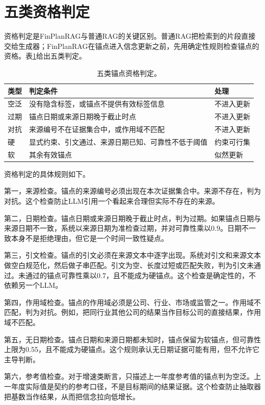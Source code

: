 \section{五类资格判定}

资格判定是FinPlanRAG与普通RAG的关键区别。普通RAG把检索到的片段直接交给生成器；FinPlanRAG在锚点进入信念更新之前，先用确定性规则检查锚点的资格。表\ref{tab:qualification}给出五类判定。

\begin{table}[H]
\centering
{}
\caption{五类锚点资格判定。}
\label{tab:qualification}
\begin{tabular}{p{2.1cm}p{7.0cm}p{4.2cm}}
\toprule
类型 & 判定条件 & 处理 \\
\midrule
空泛 & 没有隐含标签，或锚点不提供有效标签信息 & 不进入更新 \\
过期 & 锚点日期或来源日期晚于截止时点 & 不进入更新 \\
对抗 & 来源编号不在证据集合中，或作用域不匹配 & 不进入更新 \\
硬 & 显式约束、引文通过、来源日期已知、可靠性不低于阈值 & 约束可行集 \\
软 & 其余有效锚点 & 似然更新 \\
\bottomrule
\end{tabular}
\end{table}

资格判定的具体规则如下。

第一，来源检查。锚点的来源编号必须出现在本次证据集合中。来源不存在，判为对抗。这个检查防止LLM引用一个看起来合理但实际不存在的来源。

第二，日期检查。锚点日期或来源日期晚于截止时点，判为过期。如果锚点日期与来源日期不一致，系统以来源日期为准检查过期，并对可靠性乘以0.9。日期不一致本身不是拒绝理由，但它是一个时间一致性疑点。

第三，引文检查。锚点的引文必须在来源文本中逐字出现。系统对引文和来源文本做空白规范化，然后做子串匹配。引文为空、长度过短或匹配失败，判为引文未通过。未通过的锚点可靠性乘以0.7，且不能成为硬锚点。这个检查是确定性的，不依赖另一个LLM。

第四，作用域检查。锚点的作用域必须是公司、行业、市场或监管之一。作用域不匹配，判为对抗。例如，把同行业其他公司的结果当作目标公司的直接结果，作用域不匹配。

第五，无日期检查。锚点日期和来源日期都未知时，锚点保留为软锚点，但可靠性上限为0.55，且不能成为硬锚点。这个规则承认无日期证据可能有用，但不允许它主导判断。

第六，参考值检查。对于增速类断言，只描述上一年度参考值的锚点判为空泛。上一年度实际值是契约的参考口径，不是目标期间的结果证据。这个检查防止抽取器把基数当作结果，从而把信念拉向低增长。

